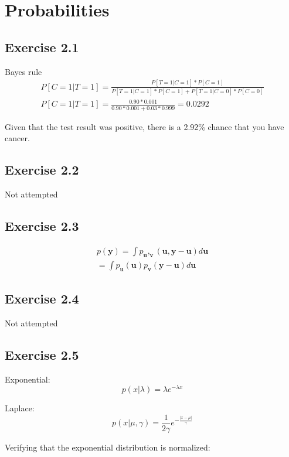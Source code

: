 \section{Probabilities}

\subsection*{Exercise 2.1}
Bayes rule
\begin{gather}
  P[C=1|T=1] = \frac{P[T=1|C=1]*P[C=1]}{P[T=1|C=1]*P[C=1] + P[T=1|C=0]*P[C=0]} \\
  P[C=1|T=1]= \frac{0.90*0.001}{0.90*0.001 + 0.03*0.999} = 0.0292
\end{gather}

Given that the test result was positive, there is a 2.92\% chance that you have cancer.

\subsection{Exercise 2.2}
Not attempted

\subsection*{Exercise 2.3}
\begin{gather}
  p(\mathbf{y}) = \int p_\mathbf{u},_\mathbf{v}(\mathbf{u},\mathbf{y}-\mathbf{u})d\mathbf{u} \\
  = \int p_\mathbf{u}(\mathbf{u})p_\mathbf{v}(\mathbf{y} - \mathbf{u})d\mathbf{u}
\end{gather}

\subsection{Exercise 2.4}
Not attempted

\subsection*{Exercise 2.5}
Exponential:
\begin{equation}
  p(x|\lambda) = \lambda e^{-\lambda x}
\end{equation}

Laplace: 
\begin{equation}
  p(x|\mu,\gamma) = \frac{1}{2\gamma} e^{-\frac{|x-\mu|}{\gamma}}
\end{equation}

Verifying that the exponential distribution is normalized: 

